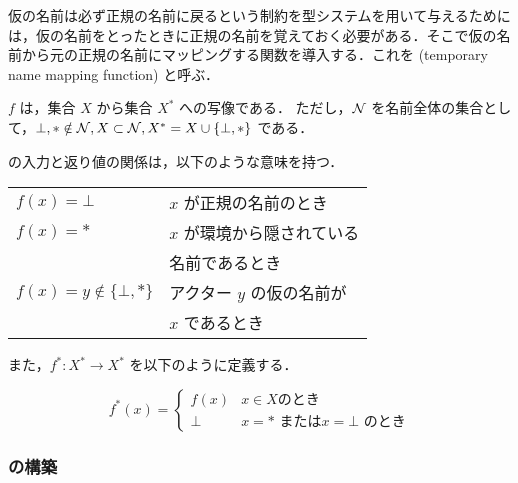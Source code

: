 




仮の名前は必ず正規の名前に戻るという制約を型システムを用いて与えるためには，仮の名前をとったときに正規の名前を覚えておく必要がある．そこで仮の名前から元の正規の名前にマッピングする関数を導入する．これを \tmp (temporary name mapping function) と呼ぶ．

\begin{dfn}[\tmp]
  \tmp $f$ は，集合 $X$ から集合 $X^*$ への写像である．
  ただし，${\cal N}$ を名前全体の集合として，$ \bot, \ast \notin {\cal N}, X \subset {\cal N}, X^* = X \cup \{\bot,\ast\} $ である．
\end{dfn}

\tmp の入力と返り値の関係は，以下のような意味を持つ．

\begin{table}[htb]
  \begin{tabular}{ll}
    $ f(x) = \bot $ & $ x $ が正規の名前のとき \\
    $ f(x) = \ast $ & $ x $ が環境から隠されている \\
    & 名前であるとき \\
    $ f(x) = y \notin \{\bot,\ast\} $ & アクター $ y $ の仮の名前が \\
    & $ x $ であるとき
  \end{tabular}
\end{table}

また，$f^{*} : X^* \rightarrow X^*$ を以下のように定義する．

\begin{adjustvboxheight}
  \[ f^{*}(x) = \begin{cases}
    f(x) & x \in X \mbox{のとき} \\
    \bot & x = \ast \mbox{\ または} x = \bot \mbox{\ のとき}
  \end{cases} \]
  \vspace{1pt}
\end{adjustvboxheight}


\subsubsection{\tmp の構築}

